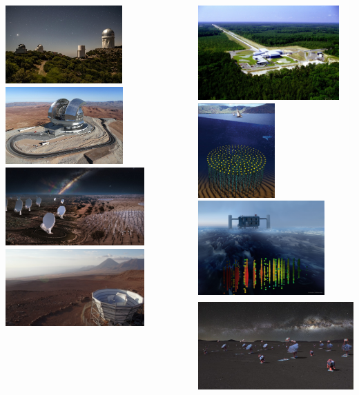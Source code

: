 \documentclass[aspectratio=169]{beamer}
\begin{document}
\begin{frame}
\begin{columns}
        \includegraphics[height=0.15183\textwidth]{figures/telescopes/desi.jpg}%
        \includegraphics[height=0.15183\textwidth]{figures/telescopes/eelt.jpg}%
        \includegraphics[height=0.15183\textwidth]{figures/telescopes/ska.jpg}%
        \includegraphics[height=0.15183\textwidth]{figures/telescopes/SO.jpg}%
        \vspace{-1pt}

        \includegraphics[height=0.18428\textwidth]{figures/telescopes/ligo.jpg}%
        \includegraphics[height=0.18428\textwidth]{figures/telescopes/km3n.jpg}%
        \includegraphics[height=0.18428\textwidth]{figures/telescopes/icecube.jpg}%
        \includegraphics[height=0.18428\textwidth]{figures/telescopes/CTA.jpg}%


\end{columns}
\end{frame}
\end{document}
